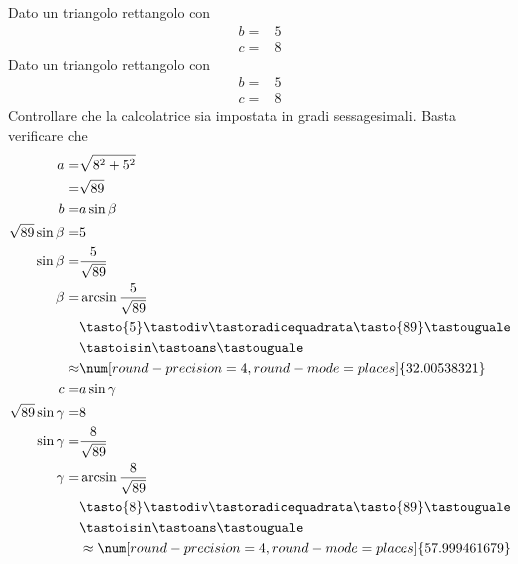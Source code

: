 \begin{exercise}
	Dato un triangolo rettangolo con
	\begin{align*}
	b=&5\\
	c=&8
	\end{align*}
	\tcblower
	Dato un triangolo rettangolo con
	\begin{align*}
	b=&5\\
	c=&8
	\end{align*}
	Controllare che la calcolatrice sia impostata in gradi sessagesimali.
	Basta verificare che \testgradi 
	\begin{align*}
	a=&\sqrt{8^2+5^2}\\
	=&\sqrt{89}\\
	b=&a\sin\beta\\
	\sqrt{89}\sin\beta=&5\\
	\sin\beta=&\frac{5}{\sqrt{89}}\\
	\beta=&\arcsin\frac{5}{\sqrt{89}}\\
	&\tasto{5}\tastodiv\tastoradicequadrata\tasto{89}\tastouguale\\
	&\tastoisin\tastoans\tastouguale\\
	\approx&\num[round-precision=\lungarrotandamento,round-mode=places]{32.00538321}\\
	c=&a\sin\gamma\\
\sqrt{89}\sin\gamma=&8\\
\sin\gamma=&\frac{8}{\sqrt{89}}\\
\gamma=&\arcsin\frac{8}{\sqrt{89}}\\
&\tasto{8}\tastodiv\tastoradicequadrata\tasto{89}\tastouguale\\
&\tastoisin\tastoans\tastouguale\\
&\approx\num[round-precision=\lungarrotandamento,round-mode=places]{57.999461679}\\
	\end{align*}
\end{exercise}

